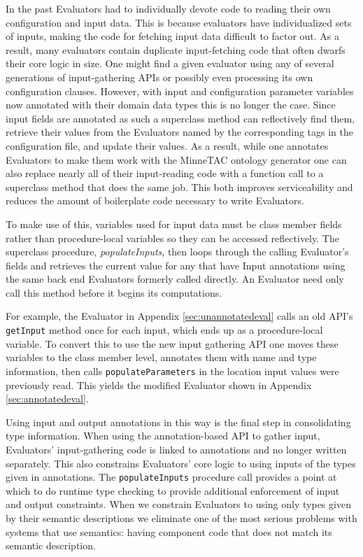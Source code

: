 \documentclass{article}
\begin{document}
In the past Evaluators had to individually devote code to reading their own configuration and input data.
This is because evaluators have individualized sets of inputs, making the code for fetching input data difficult to factor out.
As a result, many evaluators contain duplicate input-fetching code that often dwarfs their core logic in size.
One might find a given evaluator using any of several generations of input-gathering APIs or possibly even processing its own configuration clauses.
However, with input and configuration parameter variables now annotated with their domain data types this is no longer the case.
Since input fields are annotated as such a superclass method can reflectively find them, retrieve their values from the Evaluators named by the corresponding tags in the configuration file, and update their values.
As a result, while one annotates Evaluators to make them work with the MinneTAC ontology generator one can also replace nearly all of their input-reading code with a function call to a superclass method that does the same job.
This both improves serviceability and reduces the amount of boilerplate code necessary to write Evaluators.

To make use of this, variables used for input data must be class member fields rather than procedure-local variables so they can be accessed reflectively.
The superclass procedure, \emph{populateInputs}, then loops through the calling Evaluator's fields and retrieves the current value for any that have Input annotations using the same back end Evaluators formerly called directly.
An Evaluator need only call this method before it begins its computations.

For example, the Evaluator in Appendix \ref{sec:unannotatedeval} calls an old API's \texttt{getInput} method once for each input, which ends up as a procedure-local variable.
To convert this to use the new input gathering API one moves these variables to the class member level, annotates them with name and type information, then calls \texttt{populateParameters} in the location input values were previously read.
This yields the modified Evaluator shown in Appendix \ref{sec:annotatedeval}.

Using input and output annotations in this way is the final step in consolidating type information.
When using the annotation-based API to gather input, Evaluators' input-gathering code is linked to annotations and no longer written separately.
This also constrains Evaluators' core logic to using inputs of the types given in annotations.
The \texttt{populateInputs} procedure call provides a point at which to do runtime type checking to provide additional enforcement of input and output constraints.
When we constrain Evaluators to using only types given by their semantic descriptions we eliminate one of the most serious problems with systems that use semantics:  having component code that does not match its semantic description.
\end{document}

